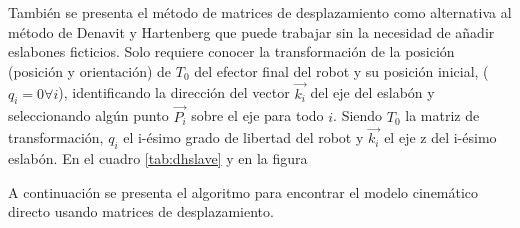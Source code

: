 

También se presenta el método de matrices de desplazamiento \cite{barrientos2012modelado} como alternativa al método de Denavit y Hartenberg que puede trabajar sin la necesidad de añadir eslabones ficticios. Solo requiere conocer la transformación de la posición (posición y orientación) de $T_0$ del efector final del robot y su posición inicial, ($q_i=0 \forall i$), identificando la dirección del vector $\vec{k_i}$ del eje del eslabón y seleccionando algún punto $\vec{P_i}$ sobre el eje para todo $i$. Siendo $T_0$ la matriz de transformación, $q_i$ el i-\'esimo grado de libertad del robot y $\vec{k_i}$ el eje z del i-\'esimo eslabón. En el cuadro \ref{tab:dhslave} y en la figura 



A continuación se presenta el algoritmo para encontrar el modelo cinemático directo usando matrices de desplazamiento.


